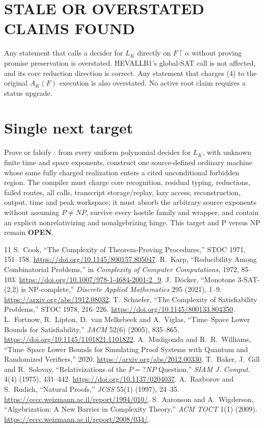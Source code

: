 \documentclass[11pt]{article}
\newcommand{\OPEN}{\textbf{OPEN}}
\newcommand{\claim}[1]{\texttt{\detokenize{#1}}}
\begin{document}
\section{STALE OR OVERSTATED CLAIMS FOUND}

Any statement that calls a decider for \(L_K\) directly on
\(F\upharpoonright\alpha\) without proving promise preservation is
overstated.  HEVALLB1's global-SAT call is not affected, and its core
reduction direction is correct.  Any statement that charges (4) to the
original \(A_K(F)\) execution is also overstated.  No active root claim
requires a status upgrade.

\section{Single next target}

Prove or falsify \claim{DECISION-ENTANGLED-CLEANCORE-TRANSFER1}: from every
uniform polynomial decider for \(L_K\), with unknown finite time and space
exponents, construct one source-defined ordinary machine whose same fully
charged realization enters a cited unconditional forbidden region.  The
compiler must charge core recognition, residual typing, reductions, failed
routes, all calls, transcript storage/replay, lazy access, reconstruction,
output, time and peak workspace; it must absorb the arbitrary source
exponents without assuming \(P\ne NP\), survive every hostile family and
wrapper, and contain an explicit nonrelativizing and nonalgebrizing hinge.
This target and P versus NP remain \OPEN.

\begin{thebibliography}{11}
S.~Cook, ``The Complexity of Theorem-Proving Procedures,'' STOC 1971,
151--158. \url{https://doi.org/10.1145/800157.805047}.
R.~Karp, ``Reducibility Among Combinatorial Problems,'' in
\emph{Complexity of Computer Computations}, 1972, 85--103.
\url{https://doi.org/10.1007/978-1-4684-2001-2_9}.
J.~D\"ocker, ``Monotone 3-SAT-(2,2) is NP-complete,''
\emph{Discrete Applied Mathematics} 295 (2021), 1--9.
\url{https://arxiv.org/abs/1912.08032}.
T.~Schaefer, ``The Complexity of Satisfiability Problems,'' STOC 1978,
216--226. \url{https://doi.org/10.1145/800133.804350}.
L.~Fortnow, R.~Lipton, D.~van Melkebeek and A.~Viglas,
``Time--Space Lower Bounds for Satisfiability,'' \emph{JACM} 52(6) (2005),
835--865. \url{https://doi.org/10.1145/1101821.1101822}.
A.~Mudigonda and R.~R.~Williams,
``Time--Space Lower Bounds for Simulating Proof Systems with Quantum and
Randomized Verifiers,'' 2020. \url{https://arxiv.org/abs/2012.00330}.
T.~Baker, J.~Gill and R.~Solovay,
``Relativizations of the \(P=?NP\) Question,'' \emph{SIAM J. Comput.} 4(4)
(1975), 431--442. \url{https://doi.org/10.1137/0204037}.
A.~Razborov and S.~Rudich, ``Natural Proofs,''
\emph{JCSS} 55(1) (1997), 24--35.
\url{https://eccc.weizmann.ac.il/report/1994/010/}.
S.~Aaronson and A.~Wigderson, ``Algebrization: A New Barrier in Complexity
Theory,'' \emph{ACM TOCT} 1(1) (2009).
\url{https://eccc.weizmann.ac.il/report/2008/034/}.
\end{thebibliography}
\end{document}
